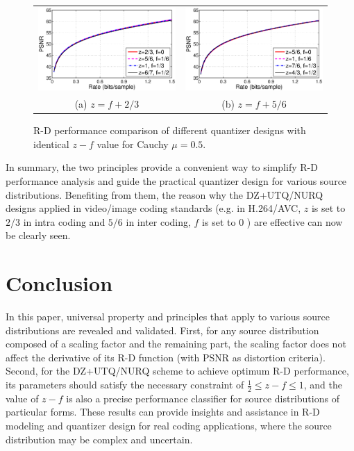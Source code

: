 \documentclass[smallabstract,smallcaptions]{dccpaper}
\begin{document}
\begin{figure}
\begin{center}
\begin{tabular}{cc}
\includegraphics[width = 0.45\linewidth]{Figures/section4/RD_Cauchy_mu=0_5_z=p+0_67} &
\includegraphics[width = 0.45\linewidth]{Figures/section4/RD_Cauchy_mu=0_5_z=p+0_83} \\
{\small (a) $z=f+2/3$} & {\small (b) $z=f+5/6$}
\end{tabular}
\end{center}
\vspace{-20pt}
\caption{\label{fig:RD_same_pattern}
R-D performance comparison of different quantizer designs with identical $z-f$ value for Cauchy $\mu=0.5$.}
\end{figure}

In summary, the two principles provide a convenient way to simplify R-D performance analysis and guide the practical quantizer design for various source distributions. Benefiting from them, the reason why the DZ+UTQ/NURQ designs applied in video/image coding standards (e.g. in H.264/AVC, $z$ is set to $2/3$ in intra coding and $5/6$ in inter coding, $f$ is set to $0$ \cite{Sullivan_VCIP2005}) are effective can now be clearly seen.

\section{Conclusion}
\label{sec:conclusion}

In this paper, universal property and principles that apply to various source distributions are revealed and validated. First, for any source distribution composed of a scaling factor and the remaining part, the scaling factor does not affect the derivative of its R-D function (with PSNR as distortion criteria). Second, for the DZ+UTQ/NURQ scheme to achieve optimum R-D performance, its parameters should satisfy the necessary constraint of $\frac{1}{2} \le z - f \le 1$, and the value of $z - f$ is also a precise performance classifier for source distributions of particular forms. These results can provide insights and assistance in R-D modeling and quantizer design for real coding applications, where the source distribution may be complex and uncertain.
\end{document}

